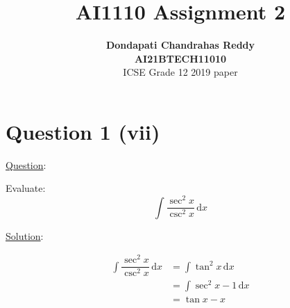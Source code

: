 \documentclass[journal,12pt,twocolumn]{IEEEtran}
\begin{document}
\title{\textbf{AI1110 Assignment 2} }
\author{\textbf{Dondapati Chandrahas Reddy}\\\textbf{AI21BTECH11010}\\ ICSE Grade 12 2019 paper}
\maketitle

{ \section {Question 1 (vii)\newline}}
{\underline{Question}:\newline}

Evaluate: \begin{equation*} \int \dfrac{\sec^2 x}{\csc^2 x}\, \mathrm{d}x \end{equation*}

{\underline{Solution}:}

\begin{align}
\int \dfrac{\sec^2 x}{\csc^2 x} \, \mathrm{d}x &=  \int \tan^2 x \, \mathrm{d}x \nonumber \\
&= \int \sec^2 x-1 \, \mathrm{d}x \nonumber \\
&= \tan x - x \nonumber
\end{align}
\end{document}
